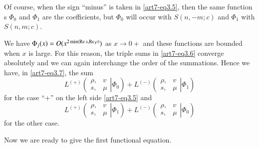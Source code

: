 Of course, when the sign ``minus'' is taken in \eqref{art7-eq3.5}, then the same function s $\Phi_0$ and $\Phi_1$ are the coefficients, but $\Phi_0$ will occur with $S(n,-m;c)$ and $\Phi_1$ with $S (n, m;c)$.

We have $\Phi_j(x) = O (x^{2 \min (\operatorname{Re} s, \operatorname{Re} \rho)})$ as $x \to 0 + $ and these functions are bounded when $x$ is large. For this reason, the triple sums in \eqref{art7-eq3.6} converge absolutely and we can again interchange the order of the summations. Hence we have, in \eqref{art7-eq3.7}, the sum 
\begin{equation}
L^{(+)}
\left( 
\left. 
\begin{matrix}
\rho, & v\\
s, & \mu
\end{matrix}
\right| \Phi_0 
\right) + L^{(-)}
\left( 
\left. 
\begin{matrix}
\rho, & v\\
s, & \mu
\end{matrix}
\right| \Phi_1 
\right)\label{art7-eq3.9}
\end{equation}
for the case ``+'' on the left side \eqref{art7-eq3.5} and 
\begin{equation}
L^{(+)}
\left( 
\left. 
\begin{matrix}
\rho, & v\\
s, & \mu
\end{matrix}
\right| \Phi_1 
\right) + L^{(-)}
\left( 
\left. 
\begin{matrix}
\rho, & v\\
s, & \mu
\end{matrix}
\right| \Phi_0 
\right)
\label{art7-eq3.10}
\end{equation}
for the other case.

Now we are ready to give the first functional equation.

